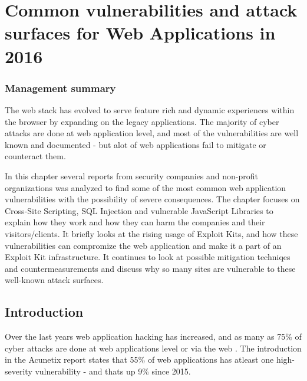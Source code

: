 \chapter[Web Application vulnerabilities in 2016]{Common vulnerabilities and attack surfaces for Web Applications in 2016}

\subsection*{Management summary}
The web stack has evolved to serve feature rich and dynamic experiences within the browser by expanding on the legacy applications. The majority of cyber attacks are done at web application level, and most of the vulnerabilities are well known and documented - but alot of web applications fail to mitigate or counteract them.

In this chapter several reports from security companies and non-profit organizations was analyzed to find some of the most common web application vulnerabilities with the possibility of severe consequences. The chapter focuses on Cross-Site Scripting, SQL Injection and vulnerable JavaScript Libraries to explain how they work and how they can harm the companies and their visitors/clients. It briefly looks at the rising usage of Exploit Kits, and how these vulnerabilities can compromize the web application and make it a part of an Exploit Kit infrastructure. It continues to look at possible mitigation techniqes and countermeasurements and discuss why so many sites are vulnerable to these well-known attack surfaces.
\pagebreak
\section{Introduction}
Over the last years web application hacking has increased, and as many as 75\% of cyber attacks are done at web applications level or via the web \cite{AcunetixCompany}. The introduction in the Acunetix report states that 55\% of web applications has atleast one high-severity vulnerability - and thats up 9\% since 2015.

